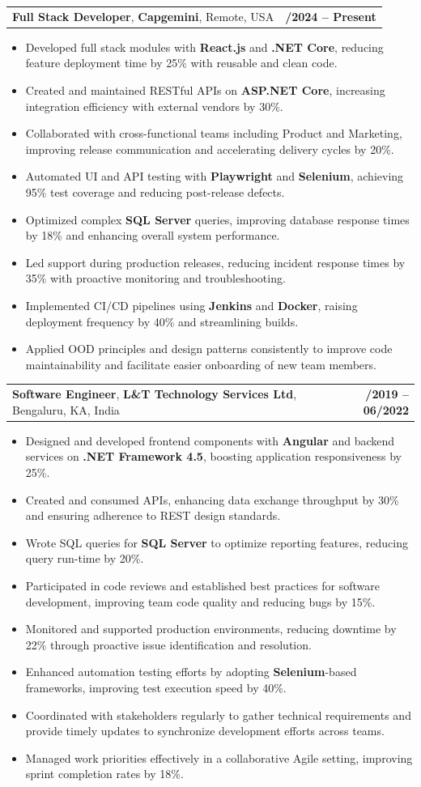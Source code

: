 \documentclass[letterpaper,11pt]{article}
\makeatletter
\newcommand{\resumeItem}[1]{
  \item\footnotesize{
    {#1 \vspace{-2pt}}
  }
}
\newcommand{\resumeSubheading}[4]{
  \vspace{-2pt}\item
    \begin{tabular*}{1.0\textwidth}[t]{l@{\extracolsep{\fill}}r}
      \textbf{\fontsize{10pt}{14pt}\selectfont #3}, \textbf{\fontsize{10pt}{14pt}\selectfont #1}, \fontsize{10pt}{14pt}\selectfont #4 & \textbf{\fontsize{10pt}{14pt}\selectfont #2} \\
    \end{tabular*}\vspace{-7pt}
}
\newcommand{\resumeItemListStart}{\begin{itemize}[leftmargin=*]}
\newcommand{\resumeItemListEnd}{\end{itemize}\vspace{-5pt}}
\makeatother
\begin{document}
    \resumeSubheading
        {Capgemini}{01/2024 -- Present}
        {Full Stack Developer}{Remote, USA}
      \resumeItemListStart
        \resumeItem{Developed full stack modules with \textbf{React.js} and \textbf{.NET Core}, reducing feature deployment time by 25\% with reusable and clean code.}
        \resumeItem{Created and maintained RESTful APIs on \textbf{ASP.NET Core}, increasing integration efficiency with external vendors by 30\%.}
        \resumeItem{Collaborated with cross-functional teams including Product and Marketing, improving release communication and accelerating delivery cycles by 20\%.}
        \resumeItem{Automated UI and API testing with \textbf{Playwright} and \textbf{Selenium}, achieving 95\% test coverage and reducing post-release defects.}
        \resumeItem{Optimized complex \textbf{SQL Server} queries, improving database response times by 18\% and enhancing overall system performance.}
        \resumeItem{Led support during production releases, reducing incident response times by 35\% with proactive monitoring and troubleshooting.}
        \resumeItem{Implemented CI/CD pipelines using \textbf{Jenkins} and \textbf{Docker}, raising deployment frequency by 40\% and streamlining builds.}
        \resumeItem{Applied OOD principles and design patterns consistently to improve code maintainability and facilitate easier onboarding of new team members.}
      \resumeItemListEnd

    \resumeSubheading
        {L\&T Technology Services Ltd}{08/2019 -- 06/2022}
        {Software Engineer}{Bengaluru, KA, India}
      \resumeItemListStart
        \resumeItem{Designed and developed frontend components with \textbf{Angular} and backend services on \textbf{.NET Framework 4.5}, boosting application responsiveness by 25\%.}
        \resumeItem{Created and consumed APIs, enhancing data exchange throughput by 30\% and ensuring adherence to REST design standards.}
        \resumeItem{Wrote SQL queries for \textbf{SQL Server} to optimize reporting features, reducing query run-time by 20\%.}
        \resumeItem{Participated in code reviews and established best practices for software development, improving team code quality and reducing bugs by 15\%.}
        \resumeItem{Monitored and supported production environments, reducing downtime by 22\% through proactive issue identification and resolution.}
        \resumeItem{Enhanced automation testing efforts by adopting \textbf{Selenium}-based frameworks, improving test execution speed by 40\%.}
        \resumeItem{Coordinated with stakeholders regularly to gather technical requirements and provide timely updates to synchronize development efforts across teams.}
        \resumeItem{Managed work priorities effectively in a collaborative Agile setting, improving sprint completion rates by 18\%.}
      \resumeItemListEnd
\end{document}
